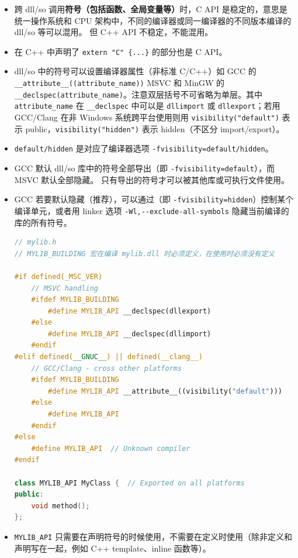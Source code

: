 

\begin{itemize}
\item 跨 dll/so 调用\textbf{符号（包括函数、全局变量等）}时，C API 是稳定的，意思是统一操作系统和 CPU 架构中，不同的编译器或同一编译器的不同版本编译的 dll/so 等可以混用。 但 C++ API 不稳定，不能混用。
\item 在 C++ 中声明了 \verb`extern "C" {...}` 的部分也是 C API。
\item dll/so 中的符号可以设置编译器属性（非标准 C/C++）如 GCC 的 \verb`__attribute__((attribute_name))` MSVC 和 MinGW 的 \verb`__declspec(attribute_name)`。注意双层括号不可省略为单层。其中 \verb`attribute_name` 在 \verb`__declspec` 中可以是 \verb`dllimport` 或 \verb`dllexport`；若用 GCC/Clang 在非 Windows 系统跨平台使用则用 \verb`visibility("default")` 表示 public，\verb`visibility("hidden")` 表示 hidden（不区分 import/export）。
\item \verb`default/hidden` 是对应了编译器选项 \verb`-fvisibility=default/hidden`。
\item GCC 默认 dll/so 库中的符号全部导出（即 \verb`-fvisibility=default`），而 MSVC 默认全部隐藏。 只有导出的符号才可以被其他库或可执行文件使用。
\item GCC 若要默认隐藏（推荐），可以通过（即 \verb`-fvisibility=hidden`）控制某个编译单元，或者用 linker 选项 \verb`-Wl,--exclude-all-symbols` 隐藏当前编译的库的所有符号。
\begin{lstlisting}[language=cpp]
// mylib.h
// MYLIB_BUILDING 宏在编译 mylib.dll 时必须定义，在使用时必须没有定义

#if defined(_MSC_VER)
    // MSVC handling
    #ifdef MYLIB_BUILDING
        #define MYLIB_API __declspec(dllexport)
    #else
        #define MYLIB_API __declspec(dllimport)
    #endif
#elif defined(__GNUC__) || defined(__clang__)
    // GCC/Clang - cross other platforms
    #ifdef MYLIB_BUILDING
        #define MYLIB_API __attribute__((visibility("default")))
    #else
        #define MYLIB_API
    #endif
#else
    #define MYLIB_API  // Unknown compiler
#endif

class MYLIB_API MyClass {  // Exported on all platforms
public:
    void method();
};
\end{lstlisting}
\item \verb`MYLIB_API` 只需要在声明符号的时候使用，不需要在定义时使用（除非定义和声明写在一起，例如 C++ template、inline 函数等）。
\end{itemize}
